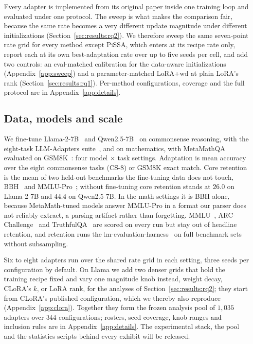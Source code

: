 \documentclass[11pt]{article}
\begin{document}
Every adapter is implemented from its original paper inside one training loop
and evaluated under one protocol. The sweep is what makes the comparison fair,
because the same rate becomes a very different update magnitude under different
initializations (Section~\ref{sec:results:rq2}). We therefore sweep the same
seven-point rate grid for every method except PiSSA, which enters at its recipe
rate only, report each at its own best-adaptation rate over up to five seeds per
cell, and add two controls: an eval-matched calibration for the data-aware
initializations (Appendix~\ref{app:sweep}) and a parameter-matched
LoRA{+}wd at plain LoRA's rank (Section~\ref{sec:results:rq1}). Per-method configurations, coverage and the
full protocol are in Appendix~\ref{app:details}.

\subsection{Data, models and scale}\label{sec:method:setup}
We fine-tune Llama-2-7B~\citep{touvron2023llama2} and
Qwen2.5-7B~\citep{qwen2025qwen25} on commonsense reasoning, with the eight-task
LLM-Adapters suite~\citep{hu2023llmadapters}, and on mathematics, with
MetaMathQA~\citep{yu2023metamath} evaluated on GSM8K~\citep{cobbe2021gsm8k}:
four model $\times$ task settings. Adaptation is mean accuracy over the eight
commonsense tasks (CS-8) or GSM8K exact match. Core retention is the mean of two
held-out benchmarks the fine-tuning data does not touch,
BBH~\citep{suzgun2023bbh} and MMLU-Pro~\citep{wang2024mmlupro}; without
fine-tuning core retention stands at $26.0$ on Llama-2-7B and $44.4$ on
Qwen2.5-7B. In the math settings it is BBH alone,
because MetaMath-tuned models answer MMLU-Pro in a format our parser does not
reliably extract, a parsing artifact rather than forgetting.
MMLU~\citep{hendrycks2021mmlu}, ARC-Challenge~\citep{clark2018arc} and
TruthfulQA~\citep{lin2022truthfulqa} are scored on every run but stay out of
headline retention, and retention runs the
lm-evaluation-harness~\citep{evalharness} on full benchmark sets without
subsampling.

Six to eight adapters run over the shared rate grid in each setting, three seeds
per configuration by default. On Llama we add two denser grids that hold the
training recipe fixed and vary one magnitude knob instead, weight decay,
CLoRA's $k$, or LoRA rank, for the analyses of Section~\ref{sec:results:rq2};
they start from CLoRA's published configuration, which we thereby also
reproduce (Appendix~\ref{app:clora}). Together they form the frozen analysis pool of
$1{,}035$ adapters over $344$ configurations; rosters, seed coverage, knob
ranges and inclusion rules are in Appendix~\ref{app:details}. The experimental
stack, the pool and the statistics scripts behind every exhibit will be
released.
\end{document}
